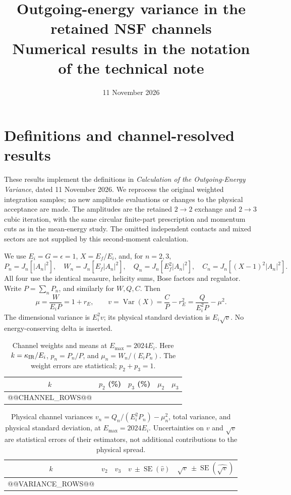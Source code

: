 \documentclass[10pt,a4paper]{article}
\title{Outgoing-energy variance in the retained NSF channels\\
\large Numerical results in the notation of the technical note}
\author{}
\date{11 November 2026}
\newcommand{\SE}{\operatorname{SE}}
\newcommand{\Var}{\operatorname{Var}}
\begin{document}
\maketitle
\vspace{-6mm}

\section{Definitions and channel-resolved results}
These results implement the definitions in \emph{Calculation of the
Outgoing-Energy Variance}, dated 11 November 2026. We reprocess the original
weighted integration samples; no new amplitude evaluations or changes to
the physical acceptance are made. The amplitudes are the retained
$2\to2$ exchange and $2\to3$ cubic iteration, with the same circular
finite-part prescription and momentum cuts as in the mean-energy study.
The omitted independent contacts and mixed sectors are not supplied by
this second-moment calculation.

We use $E_i=G=\epsilon=1$, $X=E_f/E_i$, and, for $n=2,3$,
\[
 P_n=J_n[|A_n|^2],\quad W_n=J_n[E_f|A_n|^2],\quad
 Q_n=J_n[E_f^2|A_n|^2],\quad C_n=J_n[(X-1)^2|A_n|^2].
\]
All four use the identical measure, helicity sums, Bose factors and
regulator. Write $P=\sum_nP_n$, and similarly for $W,Q,C$. Then
\begin{equation}
 \mu=\frac{W}{E_iP}=1+r_E,\qquad
 v=\Var(X)=\frac{C}{P}-r_E^2
 =\frac{Q}{E_i^2P}-\mu^2.
 \label{eq:variance}
\end{equation}
The dimensional variance is $E_i^2v$; its physical standard deviation is
$E_i\sqrt v$. No energy-conserving delta is inserted.

\begin{table}[h!]
\centering\small
\caption{Channel weights and means at $E_{\max}=2024E_i$.
Here $k=\kappa_{\rm IR}/E_i$, $p_n=P_n/P$, and $\mu_n=W_n/(E_iP_n)$.
The weight errors are statistical; $p_2+p_3=1$.}
\begin{tabular}{ccccc}
\toprule
$k$ & $p_2$ (\%) & $p_3$ (\%) & $\mu_2$ & $\mu_3$\\
\midrule
@@CHANNEL_ROWS@@
\bottomrule
\end{tabular}
\end{table}

\begin{table}[h!]
\centering\small
\caption{Physical channel variances $v_n=Q_n/(E_i^2P_n)-\mu_n^2$,
total variance, and physical standard deviation, at $E_{\max}=2024E_i$.
Uncertainties on $v$ and $\sqrt v$ are statistical errors of their
estimators, not additional contributions to the physical spread.}
\begin{tabular}{ccccc}
\toprule
$k$ & $v_2$ & $v_3$ & $v\ \pm\SE(\widehat v)$ &
$\sqrt v\ \pm\SE(\widehat{\sqrt v})$\\
\midrule
@@VARIANCE_ROWS@@
\bottomrule
\end{tabular}
\end{table}
\end{document}
